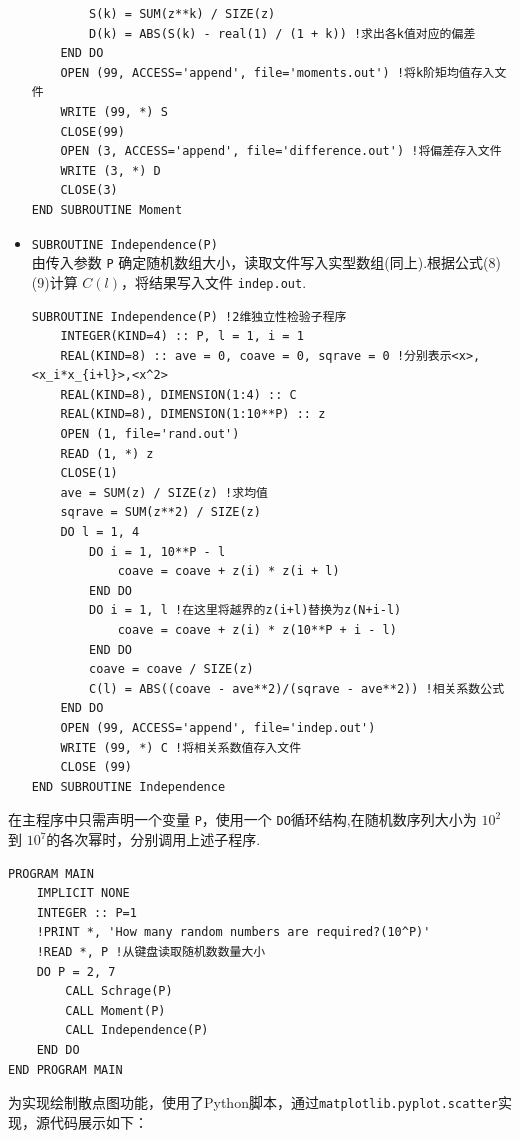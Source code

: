\documentclass[12pt,a4paper,utf8]{ctexart}
\begin{document}
\begin{itemize}
\begin{framed}
\begin{lstlisting}
        S(k) = SUM(z**k) / SIZE(z)
        D(k) = ABS(S(k) - real(1) / (1 + k)) !求出各k值对应的偏差
    END DO
    OPEN (99, ACCESS='append', file='moments.out') !将k阶矩均值存入文件
    WRITE (99, *) S
    CLOSE(99)
    OPEN (3, ACCESS='append', file='difference.out') !将偏差存入文件
    WRITE (3, *) D
    CLOSE(3)
END SUBROUTINE Moment
\end{lstlisting}
\end{framed}
    \item \texttt{SUBROUTINE Independence(P)}\\
        由传入参数 \texttt{P}
        确定随机数组大小，读取文件写入实型数组(同上).根据公式(8)(9)计算
        $C(l)$，将结果写入文件 \texttt{indep.out}.
\begin{framed}
\begin{lstlisting}
SUBROUTINE Independence(P) !2维独立性检验子程序
    INTEGER(KIND=4) :: P, l = 1, i = 1
    REAL(KIND=8) :: ave = 0, coave = 0, sqrave = 0 !分别表示<x>,<x_i*x_{i+l}>,<x^2>
    REAL(KIND=8), DIMENSION(1:4) :: C
    REAL(KIND=8), DIMENSION(1:10**P) :: z
    OPEN (1, file='rand.out')
    READ (1, *) z
    CLOSE(1)
    ave = SUM(z) / SIZE(z) !求均值
    sqrave = SUM(z**2) / SIZE(z)
    DO l = 1, 4
        DO i = 1, 10**P - l
            coave = coave + z(i) * z(i + l)
        END DO
        DO i = 1, l !在这里将越界的z(i+l)替换为z(N+i-l)
            coave = coave + z(i) * z(10**P + i - l)
        END DO
        coave = coave / SIZE(z)
        C(l) = ABS((coave - ave**2)/(sqrave - ave**2)) !相关系数公式
    END DO
    OPEN (99, ACCESS='append', file='indep.out')
    WRITE (99, *) C !将相关系数值存入文件
    CLOSE (99)
END SUBROUTINE Independence
\end{lstlisting}
\end{framed}
\end{itemize}
在主程序中只需声明一个变量 \texttt{P}，使用一个
\texttt{DO}循环结构,在随机数序列大小为 $10^2$ 到 $10^7$的各次幂时，分别调用上述子程序.
\begin{framed}
\begin{lstlisting}
PROGRAM MAIN
    IMPLICIT NONE
    INTEGER :: P=1 
    !PRINT *, 'How many random numbers are required?(10^P)'
    !READ *, P !从键盘读取随机数数量大小
    DO P = 2, 7
        CALL Schrage(P)
        CALL Moment(P)
        CALL Independence(P)
    END DO
END PROGRAM MAIN    
\end{lstlisting}
\end{framed}
为实现绘制散点图功能，使用了Python脚本，通过\texttt{matplotlib.pyplot.scatter}实现，源代码展示如下：
\end{document}
